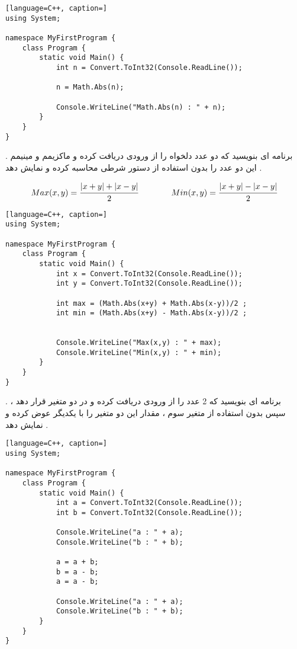 \documentclass[12pt]{article}
\begin{document}
\begin{latin}
\begin{lstlisting}[language=C++, caption=]
using System;

namespace MyFirstProgram {
	class Program {
		static void Main() {
			int n = Convert.ToInt32(Console.ReadLine());
			
			n = Math.Abs(n);

			Console.WriteLine("Math.Abs(n) : " + n);
		}
	}
}
\end{lstlisting}
\end{latin}






\newpage

 . برنامه ای بنویسید که دو عدد دلخواه را از ورودی دریافت کرده و ماکزیمم و مینیمم این دو عدد را بدون استفاده از دستور شرطی
محاسبه کرده و نمایش دهد .


\begin{align*}
Max(x,y) = \cfrac{|x+y| + |x-y|}{2} \qquad \qquad
Min(x,y) = \cfrac{|x+y| - |x-y|}{2}
\end{align*}




\begin{latin}
\begin{lstlisting}[language=C++, caption=]
using System;

namespace MyFirstProgram {
	class Program {
		static void Main() {
			int x = Convert.ToInt32(Console.ReadLine());
			int y = Convert.ToInt32(Console.ReadLine());
			
			int max = (Math.Abs(x+y) + Math.Abs(x-y))/2 ;
			int min = (Math.Abs(x+y) - Math.Abs(x-y))/2 ;
			

			Console.WriteLine("Max(x,y) : " + max);
			Console.WriteLine("Min(x,y) : " + min);
		}
	}
}
\end{lstlisting}
\end{latin}





\newpage

 . برنامه ای بنویسید که 2 عدد را از ورودی دریافت کرده و در دو متغیر قرار دهد ، سپس بدون استفاده از متغیر سوم ، مقدار این دو متغیر را با یکدیگر عوض کرده و نمایش دهد .





\begin{latin}
\begin{lstlisting}[language=C++, caption=]
using System;

namespace MyFirstProgram {
	class Program {
		static void Main() {
			int a = Convert.ToInt32(Console.ReadLine());
			int b = Convert.ToInt32(Console.ReadLine());
			
			Console.WriteLine("a : " + a);
			Console.WriteLine("b : " + b);
			
			a = a + b;
			b = a - b;
			a = a - b;

			Console.WriteLine("a : " + a);
			Console.WriteLine("b : " + b);
		}
	}
}
\end{lstlisting}
\end{latin}
\end{document}
